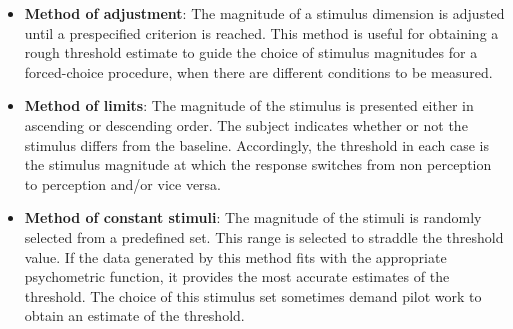 \begin{itemize}
	\item \textbf{Method of adjustment}: The magnitude of a stimulus dimension is adjusted until a prespecified criterion is reached. This method is useful for obtaining a rough threshold estimate to guide the choice of stimulus magnitudes for a forced-choice procedure, when there are different conditions to be measured. \cite{Kingdom2016}
	\item \textbf{Method of limits}: The magnitude of the stimulus is presented either in ascending or descending order.
	The subject indicates whether or not the stimulus differs from the baseline. Accordingly, the threshold in each case is the stimulus magnitude at which the response switches from non perception to perception and/or vice versa. \cite{Kingdom2016}
	\item \textbf{Method of constant stimuli}: The magnitude of the stimuli is randomly selected from a predefined set. This range is selected to straddle the threshold value. If the data generated by this method fits with the appropriate psychometric function, it provides the most accurate estimates of the threshold. The choice of this stimulus set sometimes demand pilot work to obtain an estimate of the threshold. \cite{Kingdom2016}
\end{itemize}
